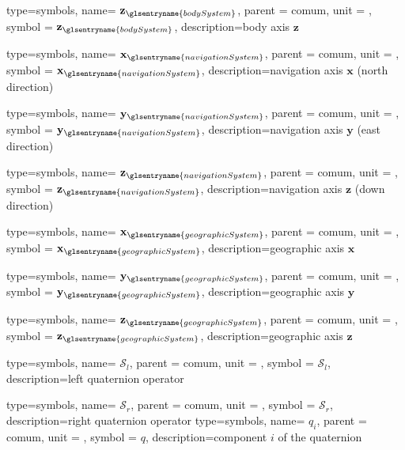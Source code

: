 {type=symbols,
name= \ensuremath{\mathbf{z}_{\glsentryname{bodySystem}}},
parent = {comum},
unit = \unexpanded{},
symbol = \ensuremath{\mathbf{z}_{\glsentryname{bodySystem}}},
description={body axis $\mathbf{z}$}
}



{type=symbols,
name= \ensuremath{\mathbf{x}_{\glsentryname{navigationSystem}}},
parent = {comum},
unit = \unexpanded{},
symbol = \ensuremath{\mathbf{x}_{\glsentryname{navigationSystem}}},
description={navigation axis $\mathbf{x}$ (north direction)}
}

{type=symbols,
name= \ensuremath{\mathbf{y}_{\glsentryname{navigationSystem}}},
parent = {comum},
unit = \unexpanded{},
symbol = \ensuremath{\mathbf{y}_{\glsentryname{navigationSystem}}},
description={navigation axis $\mathbf{y}$ (east direction)}
}

{type=symbols,
name= \ensuremath{\mathbf{z}_{\glsentryname{navigationSystem}}},
parent = {comum},
unit = \unexpanded{},
symbol = \ensuremath{\mathbf{z}_{\glsentryname{navigationSystem}}},
description={navigation axis $\mathbf{z}$ (down direction)}
}

{type=symbols,
name= \ensuremath{\mathbf{x}_{\glsentryname{geographicSystem}}},
parent = {comum},
unit = \unexpanded{},
symbol = \ensuremath{\mathbf{x}_{\glsentryname{geographicSystem}}},
description={geographic axis $\mathbf{x}$}
}

{type=symbols,
name= \ensuremath{\mathbf{y}_{\glsentryname{geographicSystem}}},
parent = {comum},
unit = \unexpanded{},
symbol = \ensuremath{\mathbf{y}_{\glsentryname{geographicSystem}}},
description={geographic axis $\mathbf{y}$}
}

{type=symbols,
name= \ensuremath{\mathbf{z}_{\glsentryname{geographicSystem}}},
parent = {comum},
unit = \unexpanded{},
symbol = \ensuremath{\mathbf{z}_{\glsentryname{geographicSystem}}},
description={geographic axis $\mathbf{z}$}
}


{type=symbols,
	name= \ensuremath{\boldsymbol{\mathcal{S}}_{l}},
	parent = {comum},
	unit = \unexpanded{},
	symbol = \ensuremath{\boldsymbol{\mathcal{S}}_{l}},
	description={left quaternion operator}
}

{type=symbols,
	name= \ensuremath{\boldsymbol{\mathcal{S}}_{r}},
	parent = {comum},
	unit = \unexpanded{},
	symbol = \ensuremath{\boldsymbol{\mathcal{S}}_{r}},
	description={right quaternion operator}
}
{type=symbols,
	name= \ensuremath{q_i},
	parent = {comum},
	unit = {},
	symbol = \ensuremath{q},
	description={component \ensuremath{i} of the quaternion }
}


